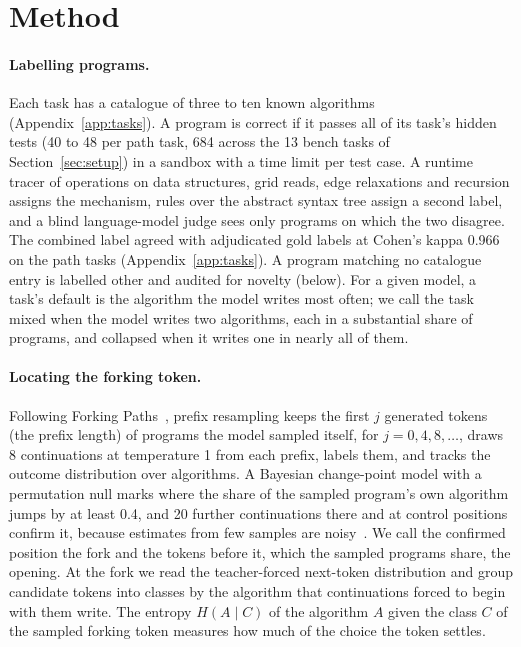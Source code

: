 \documentclass[11pt,letterpaper]{article}
\begin{document}
\section{Method}
\label{sec:method}

\paragraph{Labelling programs.}
Each task has a catalogue of three to ten known algorithms (Appendix~\ref{app:tasks}). A program is correct if it passes all of its task's hidden tests (40 to 48 per path task, 684 across the 13 bench tasks of Section~\ref{sec:setup}) in a sandbox with a time limit per test case. A runtime tracer of operations on data structures, grid reads, edge relaxations and recursion assigns the mechanism, rules over the abstract syntax tree assign a second label, and a blind language-model judge sees only programs on which the two disagree. The combined label agreed with adjudicated gold labels at Cohen's kappa 0.966 on the path tasks (Appendix~\ref{app:tasks}). A program matching no catalogue entry is labelled other and audited for novelty (below). For a given model, a task's default is the algorithm the model writes most often; we call the task mixed when the model writes two algorithms, each in a substantial share of programs, and collapsed when it writes one in nearly all of them.

\paragraph{Locating the forking token.}
Following Forking Paths~\citep{Bigelow2024}, prefix resampling keeps the first $j$ generated tokens (the prefix length) of programs the model sampled itself, for $j = 0, 4, 8, \ldots$, draws 8 continuations at temperature 1 from each prefix, labels them, and tracks the outcome distribution over algorithms. A Bayesian change-point model with a permutation null marks where the share of the sampled program's own algorithm jumps by at least 0.4, and 20 further continuations there and at control positions confirm it, because estimates from few samples are noisy~\citep{Bigelow2026}. We call the confirmed position the fork and the tokens before it, which the sampled programs share, the opening. At the fork we read the teacher-forced next-token distribution and group candidate tokens into classes by the algorithm that continuations forced to begin with them write. The entropy $H(A \mid C)$ of the algorithm $A$ given the class $C$ of the sampled forking token measures how much of the choice the token settles.
\end{document}
